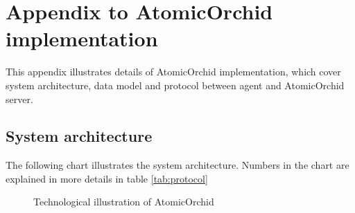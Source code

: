\chapter{Appendix to AtomicOrchid implementation}
This appendix illustrates details of AtomicOrchid implementation, which cover system architecture, data model and protocol between agent and AtomicOrchid server.

\section{System architecture} \label{app:architecture}
The following chart illustrates the system architecture. Numbers in the chart are explained in more details in table \ref{tab:protocol}
\begin{figure}[H]
  \centering
  \caption{Technological illustration of AtomicOrchid}
  \label{fig:systemDescription}
\end{figure}

